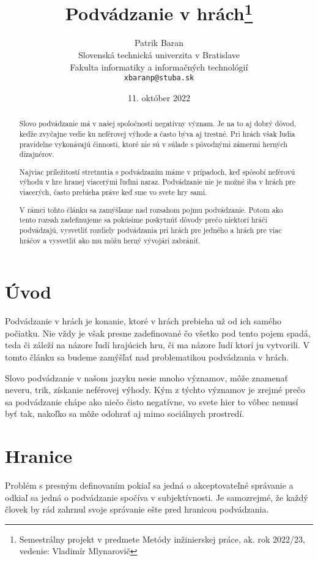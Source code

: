 \documentclass[10pt,twoside,slovak,a4paper]{article}
\title{Podvádzanie v hrách\thanks{Semestrálny projekt v predmete Metódy inžinierskej práce, ak. rok 2022/23, vedenie: Vladimír Mlynarovič}} %
\author{Patrik Baran\\[2pt]
	{\small Slovenská technická univerzita v Bratislave}\\
	{\small Fakulta informatiky a informačných technológií}\\
	{\small \texttt{xbaranp@stuba.sk}}
	}
\date{\small 11. október 2022} %
\begin{document}
\maketitle

\begin{abstract}
Slovo podvádzanie má v našej spoločnosti negatívny význam. Je na to aj dobrý dôvod, keďže zvyčajne vedie ku neférovej výhode a často býva aj trestné. Pri hrách však ľudia pravidelne vykonávajú činnosti, ktoré nie sú v súlade s pôvodnými zámermi herných dizajnérov.

Najviac príležitostí stretnutia s podvádzaním máme v prípadoch, keď spôsobí neférovú výhodu v hre hranej viacerými ľuďmi naraz. Podvádzanie nie je možné iba v hrách pre viacerých, často prebieha práve keď sme vo svete hry sami.

V rámci tohto článku sa zamýšľame nad rozsahom pojmu podvádzanie. Potom ako tento rozsah zadefinujeme sa pokúsime poskytnúť dôvody prečo niektorí hráči podvádzajú, vysvetliť rozdiely podvádzania pri hrách pre jedného a hrách pre viac hráčov a vysvetliť ako mu môžu herný vývojári zabrániť.
\end{abstract}

\newpage


\section{Úvod}

Podvádzanie v hrách je konanie, ktoré v hrách prebieha už od ich samého počiatku. Nie vždy je však presne zadefinované čo všetko pod tento pojem spadá, teda či záleží na názore ľudí hrajúcich hru, či ma názore ľudí ktorí ju vytvorili. V tomto článku sa budeme zamýšľať nad problematikou podvádzania v hrách.

Slovo podvádzanie v našom jazyku nesie mnoho významov, môže znamenať neveru, trik, získanie neférovej výhody. Kým z týchto významov je zrejmé prečo sa podvádzanie chápe ako niečo čisto negatívne, vo svete hier to vôbec nemusí byť tak, nakoľko sa môže odohrať aj mimo sociálnych prostredí.

\section{Hranice}

Problém s presným definovaním pokiaľ sa jedná o akceptovateľné správanie a odkiaľ sa jedná o podvádzanie spočíva v subjektívnosti. Je samozrejmé, že každý človek by rád zahrnul svoje správanie ešte pred hranicou podvádzania.
\end{document}
